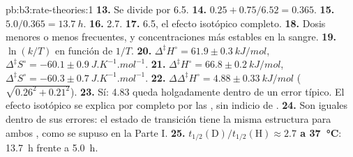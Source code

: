 \begin{solution}{pb:b3:rate-theories:1}
\textbf{13.} Se divide por 6.5.
\textbf{14.} $0.25 + 0.75/6.52 = 0.365$.
\textbf{15.} $5.0/0.365 = \qty{13.7}{h}$.
\textbf{16.} 2.7.
\textbf{17.} 6.5, el efecto isotópico completo.
\textbf{18.} Dosis menores o menos frecuentes, y concentraciones más estables en la sangre.
\textbf{19.} $\ln(k/T)$ en función de $1/T$.
\textbf{20.} $\Delta^{\ddagger}H^\circ = 61.9 \pm \qty{0.3}{kJ/mol}$, $\Delta^{\ddagger}S^\circ = -60.1 \pm \qty{0.9}{J.K^{-1}.mol^{-1}}$.
\textbf{21.} $\Delta^{\ddagger}H^\circ = 66.8 \pm \qty{0.2}{kJ/mol}$, $\Delta^{\ddagger}S^\circ = -60.3 \pm \qty{0.7}{J.K^{-1}.mol^{-1}}$.
\textbf{22.} $\Delta\Delta^{\ddagger}H^\circ = 4.88 \pm \qty{0.33}{kJ/mol}$ ($\sqrt{0.26^2 + 0.21^2}$).
\textbf{23.} Sí: 4.83 queda holgadamente dentro de un error típico. El efecto isotópico se
explica por completo por las , sin indicio de .
\textbf{24.} Son iguales dentro de sus errores: el estado de transición tiene la misma
estructura para ambos , como se supuso en la Parte I.
\textbf{25.} \textbf{$t_{1/2}(\mathrm D)/t_{1/2}(\mathrm H) \approx 2.7$ a \qty{37}{\celsius}}: \qty{13.7}{h} frente a \qty{5.0}{h}.
\end{solution}
